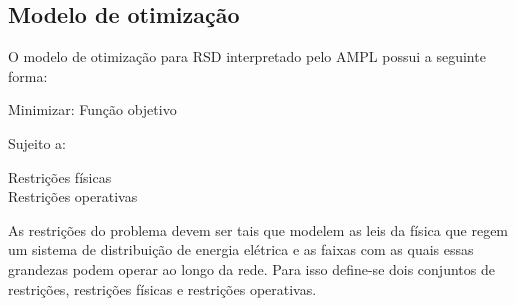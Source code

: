 \subsection{Modelo de otimização}

O modelo de otimização para RSD interpretado pelo AMPL possui a seguinte forma:

\begin{tcolorbox}[colback=white!10,title =\textbf{Modelo de um problema de otimização para RDS}]
    \begin{minipage}{\dimexpr\textwidth-\shadowsize-2\fboxrule-2\fboxsep-8pt}
    
    \begin{center}
        Minimizar: Função objetivo        
    \end{center}

    \hspace{2cm}Sujeito a:

    \begin{center}
        Restrições físicas\\
        Restrições operativas\\
    \end{center}
    \end{minipage}
\end{tcolorbox}


As restrições do problema devem ser tais que modelem as leis da física que regem um sistema de distribuição de energia elétrica e as faixas com as quais essas grandezas podem operar ao longo da rede.
Para isso define-se dois conjuntos de restrições, restrições físicas e restrições operativas.


